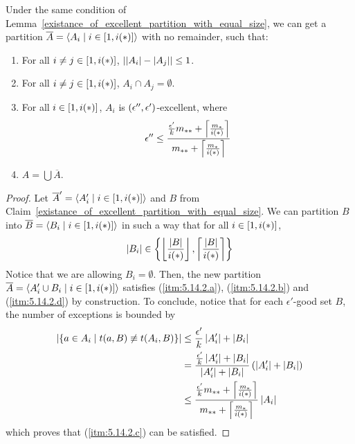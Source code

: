     \lemma[Claim 5.14.2]\label{existance_of_excellent_partition_with_equal_size_and_no_remainder}
        Under the same condition of Lemma~\ref{existance_of_excellent_partition_with_equal_size}, we can get a
        partition $\overline{A} = \left< A_i \mid i \in \left[ 1, i(*) \right] \right>$ with no remainder, such that:
        \begin{enumerate}[label=(\alph*), ref=\alph*]
            \item \label{itm:5.14.2.a} For all $i \neq j \in \left[ 1, i(*) \right]$, $\left| \left| A_i \right|- \left| A_j \right| \right| \leq 1$.
            \item \label{itm:5.14.2.b} For all $i \neq j \in \left[ 1, i(*) \right]$, $A_i \cap A_j = \emptyset$.
            \item \label{itm:5.14.2.c} For all $i \in \left[ 1, i(*) \right]$, $A_i$ is $\left( \epsilon'', \epsilon' \right)$-excellent,
                where
                $$
                    \epsilon'' \leq \frac{\frac{\epsilon'}{k} m_{**} + \left\lceil \frac{m_*}{i(*)} \right\rceil}{m_{**} + \left\lceil \frac{m_*}{i(*)} \right\rceil}
                $$
            \item \label{itm:5.14.2.d} $A = \bigcup \overline{A}$.
        \end{enumerate}
        \begin{proof}
            Let $\overline{A}' = \left< A_i' \mid i \in \left[ 1, i(*) \right] \right>$ and $B$ from 
            Claim~\ref{existance_of_excellent_partition_with_equal_size}.
            We can partition $B$ into $\overline{B} = \left< B_i \mid i \in \left[ 1, i(*) \right] \right>$ in such a way that
            for all $i \in \left[ 1, i(*) \right]$, 
            $$
                |B_i| \in \left\{ \left\lfloor \frac{\left| B \right|}{i(*)} \right\rfloor, \left\lceil \frac{\left| B \right|}{i(*)} \right\rceil \right\}
            $$
            Notice that we are allowing $B_i = \emptyset$.
            Then, the new partition $\overline{A} = \left< A_i' \cup B_i \mid i \in \left[ 1, i(*) \right] \right>$ satisfies
            (\ref{itm:5.14.2.a}), (\ref{itm:5.14.2.b}) and (\ref{itm:5.14.2.d}) by construction.
            To conclude, notice that for each $\epsilon'$-good set $B$, the number of exceptions is bounded by
            \begin{align*}
                \left| \left\{ a \in A_i \mid t(a, B) \not\equiv t(A_i, B) \right\} \right|
                    & \leq \frac{\epsilon'}{k} \left| A_i' \right| + \left| B_i \right| \\
                    & = \frac{\frac{\epsilon'}{k} \left| A_i' \right| + \left| B_i \right|}{\left| A_i' \right| + \left| B_i \right|}
                        \left( \left| A_i' \right| + \left| B_i \right| \right) \\
                    & \leq \frac{\frac{\epsilon'}{k} m_{**} + \left\lceil \frac{m_*}{i(*)} \right\rceil}{m_{**} + \left\lceil \frac{m_*}{i(*)} \right\rceil}
                        \left| A_i \right|
            \end{align*}
            which proves that (\ref{itm:5.14.2.c}) can be satisfied.
        \end{proof}

